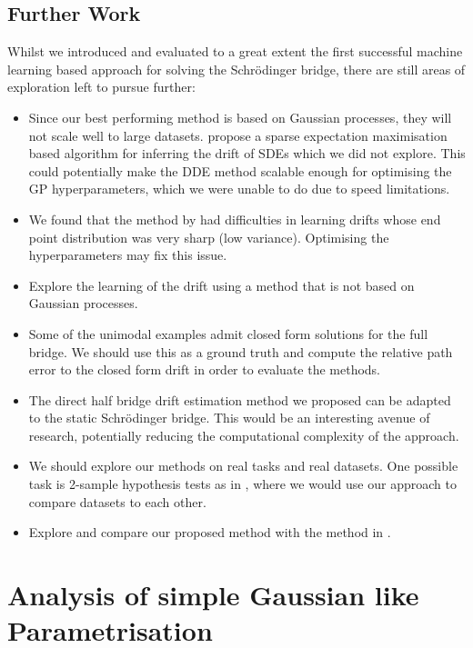 \documentclass[a4paper,12pt,twoside,openright]{report}
\theoremstyle{definition}
\begin{document}
\section{Further Work}

Whilst we introduced and evaluated to a great extent the first successful machine learning based approach for solving the Schrödinger bridge, there are still areas of exploration left to pursue further:

\begin{itemize}
    \item Since our best performing method is based on Gaussian processes, they will not scale well to large datasets. \cite{ruttor2013approximate} propose a sparse expectation maximisation based algorithm for inferring the drift of SDEs which we did not explore. This could potentially make the DDE method scalable enough for optimising the GP hyperparameters, which we were unable to do due to speed limitations.
    \item We found that the method by \cite{ruttor2013approximate} had difficulties in learning drifts whose end point distribution was very sharp (low variance). Optimising the hyperparameters may fix this issue.  
    \item Explore the learning of the drift using a method that is not based on Gaussian processes.
    \item Some of the unimodal examples admit closed form solutions for the full bridge. We should use this as a ground truth and compute the relative path error to the closed form drift in order to evaluate the methods.
    \item The direct half bridge drift estimation method we proposed can be adapted to the static Schrödinger bridge. This would be an interesting avenue of research, potentially reducing the computational complexity of the approach.
    \item We should explore our methods on real tasks and real datasets. One possible task is 2-sample hypothesis tests as in \cite{gretton2012kernel}, where we would use our approach to compare datasets to each other. 
    \item Explore and compare our proposed method with the method in \cite{bernton2019schr}.
\end{itemize}

\appendix


\singlespacing

\chapter{Analysis of simple Gaussian like Parametrisation}\label{app:bad_gauss}
\end{document}
